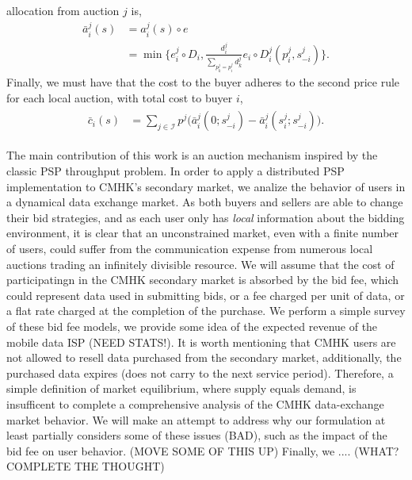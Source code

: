 \documentclass[12pt]{article}
\theoremstyle{definition}
\newcommand{\mcI}{\mathcal{I}}
\begin{document}
\begin{multicols}{2}
allocation from auction $j$ is,
\begin{align}\label{dataallocation}
    \bar{a}_i^j(s) &= a_i^j(s) \circ e \\
    &= \min\bigg\lbrace e_i^j\circ D_i,
    \frac{d_i^j}{\sum_{p_k^j= p_i^j}d_k^j} e_i\circ D_i^j(p_i^j,s_{-i}^j)\bigg\rbrace.
\end{align}
Finally, we must have that the cost to the buyer adheres to the second price
rule for each local auction, with total cost to buyer $i$,
\begin{align}\label{datacost}
\begin{split}
    \bar{c}_i(s) &= \displaystyle\sum_{j\in\mcI} 
p^j \bigg(\bar{a}_i^j(0; s_{-i}^j)
    -\bar{a}_i^j(s_i^j;s_{-i}^j)\bigg).
\end{split}
\end{align}


The main contribution of this work 
is an auction mechanism inspired by the classic PSP throughput problem. In
order to apply a distributed PSP implementation to CMHK's secondary market,
we analize the behavior of users in a dynamical data exchange market. As both buyers and sellers are able
to change their bid strategies, and as each user only has \emph{local}
information about the bidding environment, it is clear that an unconstrained
market, even with a finite number of users, could suffer from the communication
expense from numerous local auctions trading an infinitely divisible resource.
We will assume that the cost of participatingn in the CMHK secondary market is
absorbed by the bid fee, which could represent data used in submitting bids, or
a fee charged per unit of data, or a flat rate charged at the completion of the
purchase. We perform a simple survey of these bid fee models, we
provide some idea of the expected revenue of the mobile data ISP (NEED
STATS!). It is worth mentioning that CMHK users are not allowed to resell data purchased from the secondary
market, additionally, the purchased data expires (does not carry to the next
service period). Therefore, a simple definition of market equilibrium, where
supply equals demand, is insufficent to complete a comprehensive analysis of
the CMHK data-exchange market behavior. We will make an attempt to address why
our formulation at least partially considers some of these issues (BAD), such
as the impact of the bid fee on user behavior. (MOVE SOME OF THIS UP)
Finally, we  .... (WHAT? COMPLETE THE THOUGHT)


\end{multicols}
\end{document}
